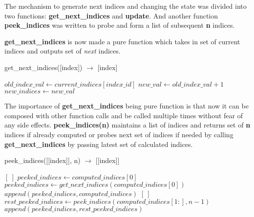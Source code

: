 The mechanism to generate next indices and changing the state was
divided into two functions: \textbf{get\_next\_indices} and \textbf{update}. And
another function \textbf{peek\_indices} was written to probe and form a list
of subsequent \textbf{n} indices.

\textbf{get\_next\_indices} is now made a pure function which takes in set of
current indices and outputs set of \textit{next} indices.

\begin{algorithm}  {get\_next\_indices([index]) $\rightarrow$ [index]}
\singlespacing

\begin{algorithmic}[1]
\State $old\_index\_val \gets current\_indices[index\_id]$
\State $new\_val \gets old\_index\_val + 1$
\State $new\_indices \gets new\_val$
\EndFor%
\State {}
\EndFunction
\end{algorithmic}
\end{algorithm}

The importance of \textbf{get\_next\_indices} being pure function is that now
it can be composed with other function calls and be called multiple times without
fear of any side effects. \textbf{peek\_indices(n)} maintains a list of indices
and returns set of \textbf{n} indices if already computed or probes next set of
indices if needed by calling \textbf{get\_next\_indices} by passing latest set of
calculated indices.

\begin{algorithm}  {peek\_indices([[index]], n) $\rightarrow$ [[index]]}
\singlespacing

\begin{algorithmic}[1]
  \State \Return $[\ ]$
\Else
    \State $peeked\_indices \gets computed\_indices[0]$
    \State $peeked\_indices \gets get\_next\_indices(computed\_indices[0])$
    \State $append(peeked\_indices, computed\_indices)$
  \Else
    \State \Return $[\ ]$
  \EndIf
  \State $rest\_peeked\_indices \gets peek\_indices(computed\_indices[1:], n - 1)$
  \State \Return $append(peeked\_indices, rest\_peeked\_indices)$
\EndIf
\EndFunction
\end{algorithmic}
\end{algorithm}

